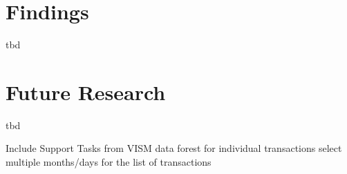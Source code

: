 \section{Findings}

tbd




\section{Future Research}

tbd


Include Support Tasks from VISM
data forest for individual transactions
select multiple months/days for the list of transactions